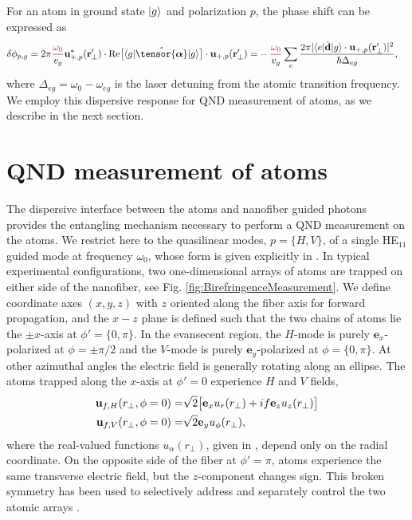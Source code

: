 \documentclass[preprint, aps,pra,onecolumn]{revtex4-1} %
\newcommand{\comment}[1]{{\color{Maroon} #1}}
\begin{document}
For an atom in ground state $\lvert{g}\rangle$ and polarization $p$, the phase shift can be expressed as \cite{le_kien_propagation_2014}
	\begin{align} \label{Eq::PhaseShiftMultilevel}
		\delta  \phi_{p,g} =2\pi \frac{\comment{ \omega_{0}}}{v_g} \mathbf{u}^*_{+, p}(\br'_\perp) \cdot {\rm Re}\big[\bra{g} 
\hat{\tensor{\boldsymbol{\alpha}}} \ket{g} \big] \cdot \mathbf{u}_{+, p}(\br'_\perp) =& - \frac{ \comment{ \omega_{0} } }{v_g} \sum_e \frac{2 \pi |\bra{e}\hat{\mathbf{d}}\ket{g} \cdot \mathbf{u}_{+,p}(\br'_\perp)|^2}{ \hbar  \Delta_{eg} } ,
	\end{align}
where $\Delta_{eg} = \omega_0 - \omega_{eg}$ is the laser detuning from the atomic transition frequency.  
We employ this dispersive response for QND measurement of atoms, as we describe in the next section.



\section{QND measurement of atoms}
The dispersive interface between the atoms and nanofiber guided photons provides the entangling mechanism necessary to perform a QND measurement on the atoms.  
We restrict here to the quasilinear modes, $p =\{H,V\}$, of a single HE$_{11}$ guided mode at frequency $\omega_0$, whose form is given explicitly in .  
In typical experimental configurations, two one-dimensional arrays of atoms are trapped on either side of the nanofiber, see Fig. \ref{fig:BirefringenceMeasurement}. 
We define coordinate axes $(x,y,z)$ with $z$ oriented along the fiber axis for forward propagation, and the $x-z$ plane is defined such that the two chains of atoms lie the $\pm x$-axis at $\phi' = \{0, \pi\}$.
In the evansecent region, the $H$-mode is purely $\mathbf{e}_x$-polarized at $\phi = \pm \pi/2$ and the $V$-mode is purely $\mathbf{e}_y$-polarized at $\phi = \{0,\pi\}$.  
At other azimuthal angles the electric field is generally rotating along an ellipse.  The atoms trapped along the $x$-axis at $\phi'=0$ experience $H$ and $V$ fields,
	\begin{align}
		\mathbf{u}_{f,H}(r_\perp, \phi = 0) = & \sqrt{2} \big[ \mathbf{e}_x u_r(r_\perp)+  if \mathbf{e}_z  u_z(r_\perp) \big] \\
		\mathbf{u}_{f,V}(r_\perp, \phi = 0) = & \sqrt{2} \mathbf{e}_y u_\phi(r_\perp), 
	\end{align}
where the real-valued functions $u_\alpha(r_\perp)$, given in , depend only on the radial coordinate.  
On the opposite side of the fiber at $\phi' = \pi$, atoms experience the same transverse electric field, but the $z$-component changes sign.   This broken symmetry has been used to selectively address and separately control the two atomic arrays \cite{mitsch_exploiting_2014, mitsch_quantum_2014, sayrin_storage_2015}.  
\end{document}
